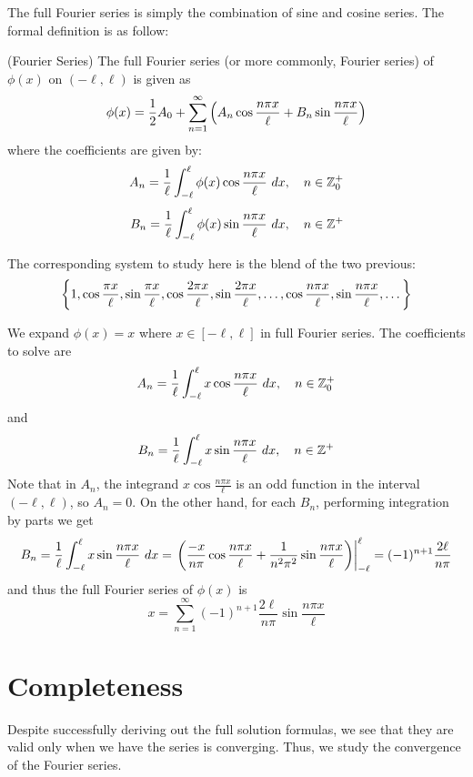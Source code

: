 The full Fourier series is simply the combination of sine and cosine series. The formal definition is as follow:

\medskip

\begin{defn} (Fourier Series)
    The full Fourier series (or more commonly, Fourier series) of $\phi(x)$ on $(-\ell,\ell)$ is given as 
    \[\phi(x) = \frac{1}{2}A_0 + \sum_{n=1}^{\infty}\left(A_n \cos\frac{n\pi x}{\ell} + B_n \sin\frac{n\pi x}{\ell}\right)\]
    where the coefficients are given by:
    \[A_n = \frac{1}{\ell} \int_{-\ell}^{\ell} \phi(x) \cos\frac{n\pi x}{\ell}\ dx,\quad n\in {\mathbb Z}^+_0\]
    \[B_n = \frac{1}{\ell} \int_{-\ell}^{\ell} \phi(x) \sin\frac{n\pi x}{\ell}\ dx,\quad n\in {\mathbb Z}^+\]
\end{defn}

The corresponding system to study here is the blend of the two previous:
\[\left\{1, \cos\frac{\pi x}{\ell}, \sin\frac{\pi x}{\ell}, \cos\frac{2\pi x}{\ell}, \sin\frac{2\pi x}{\ell} ,\dots, \cos\frac{n\pi x}{\ell}, \sin\frac{n\pi x}{\ell}, \dots\right\}\]

\medskip

\begin{ex}
    We expand $\phi(x)=x$ where $x\in [-\ell, \ell]$ in full Fourier series. The coefficients to solve are
    \[A_n = \frac{1}{\ell} \int_{-\ell}^{\ell} x\cos\frac{n\pi x}{\ell}\ dx,\quad n\in {\mathbb Z}^+_0\]
    and
    \[B_n = \frac{1}{\ell} \int_{-\ell}^{\ell} x \sin\frac{n\pi x}{\ell}\ dx,\quad n\in {\mathbb Z}^+\]
    Note that in $A_n$, the integrand $x\cos\frac{n\pi x}{\ell}$ is an odd function in the interval $(-\ell, \ell)$, so $A_n = 0$. On the other hand, for each $B_n$, performing integration by parts we get 
    \[B_n = \frac{1}{\ell} \int_{-\ell}^{\ell} x \sin\frac{n\pi x}{\ell}\ dx = \left . \left(\frac{-x}{n\pi}\cos \frac{n\pi x}{\ell} + \frac{1}{n^2\pi^2}\sin\frac{n\pi x}{\ell}\right)\right \vert_{-\ell}^\ell = (-1)^{n+1}\frac{2\ell}{n\pi}\]
    and thus the full Fourier series of $\phi(x)$ is 
    \[x = \sum_{n=1}^{\infty} (-1)^{n+1}\frac{2\ell}{n\pi}\sin\frac{n\pi x}{\ell}\]
\end{ex}

\section{Completeness}

Despite successfully deriving out the full solution formulas, we see that they are valid only when we have the series is converging. Thus, we study the convergence of the Fourier series.


